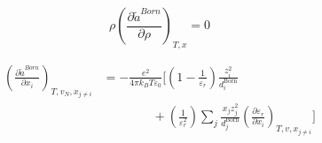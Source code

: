 \documentclass[12pt, letterpaper]{article}
\begin{document}

\begin{equation}
    \rho\left(\frac{\partial\tilde{a}^{Born}}{\partial\rho}\right)_{T,x}= 0
    \label{eq:born_ares_dadrho}
\end{equation}


\begin{equation}
    \begin{aligned}
        \left(\frac{\partial \tilde{a}^{Born}}{\partial x_{i}}\right)_{T,v_{N},x_{j\neq i}}
        &=
        -\frac{e^{2}}{4\pi k_{B}T\varepsilon_{0}}
        \Biggl[
            \left(1-\frac{1}{\varepsilon_{r}}\right)\frac{z_{i}^{2}}{d^{\text{Born}}_{i}}
            \\
            &\qquad\qquad
            +
            \left(\frac{1}{\varepsilon_{r}^{2}}\right)\sum_{j} \frac{x_{j} z_{j}^2}{d^{\text{Born}}_{j}}
            \left(\frac{\partial\varepsilon_{r}}{\partial x_{i}}\right)_{T,v,x_{j\neq i}}
        \Biggr]
    \end{aligned}
    \label{eq:born_ares_dxi}
\end{equation}

\end{document}
